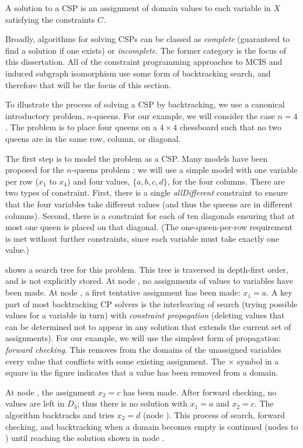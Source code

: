 A solution to a CSP is an assignment of domain values to each variable in $X$
satisfying the constraints $C$.

Broadly, algorithms for solving CSPs can be classed as \emph{complete} (guaranteed to find a solution
if one exists)
or \emph{incomplete}. The former category is the focus of this dissertation.
All of the constraint programming approaches to MCIS and induced
subgraph isomorphism use some form of backtracking search, and therefore that will
be the focus of this section.

To illustrate the process of solving a CSP by backtracking, we use a canonical
introductory problem, $n$-queens. For our example, we will consider the case
$n=4$. The problem is to place four queens on a $4 \times 4$ chessboard such
that no two queens are in the same row, column, or diagonal.

The first step is to model the problem as a CSP. Many models have been proposed
for the $n$-queens problem \citep{DBLP:reference/fai/Smith06}; we will use a
simple model with one variable per row ($x_1$ to $x_4$) and four values, $\{a, b, c, d\}$, for
the four columns.  There are two types of constraint. First, there is a single
\emph{allDifferent} constraint to ensure that the four variables take different
values (and thus the queens are in different columns). Second, there is a
constraint for each of ten diagonals
ensuring that at most one queen is placed on that diagonal.
(The one-queen-per-row requirement is met without further constraints,
since each variable must take exactly one value.)

 shows a search tree for this problem.
This tree is traversed in depth-first order, and is not explicitly
stored.
At node ,
no assignments of values to variables have been made. At node , a first
tentative assignment has been made: $x_1=a$. A key part of most backtracking CP
solvers is the interleaving of search (trying possible values for a variable
in turn) with \emph{constraint propagation} (deleting values that can be
determined not to appear in any solution that extends the current set of
assignments). For our example, we will use the simplest form of propagation:
\emph{forward checking}. This removes from the domains of the unassigned variables
every value that conflicts with some existing assignment. The $\times$ symbol
in a square in the figure indicates that a value has been removed from a domain.

At node , the assignment $x_2=c$ has been made. After forward checking, no
values are left in $D_3$; thus there is no solution with $x_1=a$ and $x_2=c$.
The algorithm backtracks and tries $x_2=d$
(node ). This process of search, forward checking, and backtracking when
a domain becomes empty is continued (nodes  to ) until reaching the solution
shown in node .

